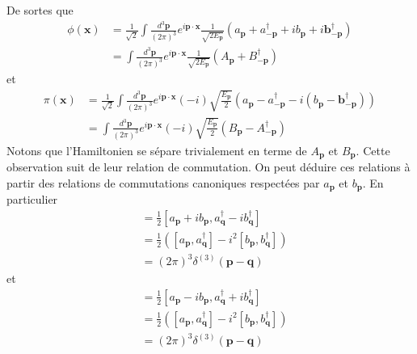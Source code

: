 \documentclass{article}
\numberwithin{equation}{section}
\begin{document}
De sortes que
\begin{align}
        \nonumber
        \phi(\mathbf{x}) &=  \frac{1}{\sqrt{2}}\int \frac{d^{3}\mathbf{p}}{(2 \pi)^{3}} e^{i \mathbf{p} \cdot \mathbf{x}} \frac{1}{\sqrt{2 E_{\mathbf{p}}}} 
        (a_{\mathbf{p}} + a^{\dagger}_{-\mathbf{p}} + ib_{\mathbf{p}} + i\mathbf{b}^{\dagger}_{-\mathbf{p}})  \\
        \label{eq:phi AB}
        &= \int \frac{d^{3} \mathbf{p}}{(2\pi)^{3}} e^{i \mathbf{p} \cdot \mathbf{x}} \frac{1}{\sqrt{2 E_{\mathbf{p}}}} (A_{\mathbf{p}} + B^{\dagger}_{-\mathbf{p}})
\end{align}
et
\begin{align}
        \nonumber
        \pi(\mathbf{x}) &=  \frac{1}{\sqrt{2}}\int \frac{d^{3}\mathbf{p}}{(2 \pi)^{3}} e^{i \mathbf{p} \cdot \mathbf{x}} (-i)\sqrt{\frac{E_{\mathbf{p}}}{2 }} 
        (a_{\mathbf{p}} - a^{\dagger}_{-\mathbf{p}} - i(b_{\mathbf{p}} - \mathbf{b}^{\dagger}_{-\mathbf{p}}))  \\
        \label{eq:pi AB}
        &=  \int \frac{d^{3}\mathbf{p}}{(2 \pi)^{3}} e^{i \mathbf{p} \cdot \mathbf{x}} (-i)\sqrt{\frac{E_{\mathbf{p}}}{2 }} 
        (B_{\mathbf{p}} - A^{\dagger}_{-\mathbf{p}}) 
\end{align}
Notons que l'Hamiltonien se sépare trivialement en terme de $A_{\mathbf{p}}$ et $B_{\mathbf{p}}$. Cette observation suit de leur relation de commutation. 
On peut déduire ces relations à partir des relations de commutations canoniques respectées par $a_{\mathbf{p}}$ et $b_{\mathbf{p}}$. En particulier
\begin{align*}
        [A_{\mathbf{p}}, A^{\dagger}_{\mathbf{q}}] &= \frac{1}{2}[a_{\mathbf{p}} + ib_{\mathbf{p}}, a^{\dagger}_{\mathbf{q}} - ib^{\dagger}_{\mathbf{q}}] \\
                                                   &= \frac{1}{2}([a_{\mathbf{p}}, a^{\dagger}_{\mathbf{q}}] - i^2[b_{\mathbf{p}}, b^{\dagger}_{\mathbf{q}}]) \\
                                                   &= (2\pi)^{3} \delta^{(3)}(\mathbf{p} - \mathbf{q})
\end{align*}
et
\begin{align*}
        [B_{\mathbf{p}}, B^{\dagger}_{\mathbf{q}}] &= \frac{1}{2}[a_{\mathbf{p}} - ib_{\mathbf{p}}, a^{\dagger}_{\mathbf{q}} + ib^{\dagger}_{\mathbf{q}}] \\
                                                   &= \frac{1}{2}([a_{\mathbf{p}}, a^{\dagger}_{\mathbf{q}}] - i^2[b_{\mathbf{p}}, b^{\dagger}_{\mathbf{q}}]) \\
                                                   &= (2\pi)^{3} \delta^{(3)}(\mathbf{p} - \mathbf{q})
\end{align*}
\end{document}
